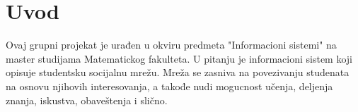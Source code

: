\section{Uvod}

Ovaj grupni projekat je urađen u okviru predmeta "Informacioni sistemi" na master studijama Matematickog fakulteta. U pitanju je informacioni sistem koji opisuje studentsku socijalnu mrežu. Mreža se zasniva na povezivanju studenata na osnovu njihovih interesovanja, a takođe nudi mogucnost učenja, deljenja znanja, iskustva, obaveštenja i slično.
